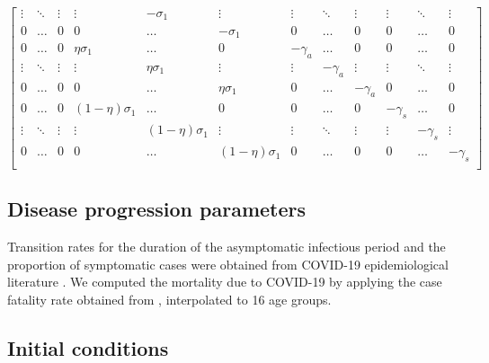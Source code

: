 {\begin{equation}
\begin{bmatrix}
\vdots & \ddots & \vdots &\vdots & -\sigma_1  & \vdots & \vdots & \ddots  & \vdots & \vdots & \ddots & \vdots\\
0 & \dots & 0  & 0 & \dots &-\sigma_1   & 0 & \dots & 0 & 0 & \dots & 0 \\ 
0 & \dots & 0  & \eta\sigma_1  & \dots & 0  & -\gamma_a & \dots & 0  & 0 & \dots & 0  \\
\vdots & \ddots & \vdots & \vdots & \eta\sigma_1  & \vdots & \vdots &  -\gamma_a & \vdots & \vdots & \ddots & \vdots\\
0 & \dots & 0  & 0 & \dots &  \eta\sigma_1 & 0 & \dots &  -\gamma_a  & 0 & \dots & 0  \\ 
0 & \dots & 0  &   (1 - \eta)\sigma_1 & \dots & 0  &  0 & \dots & 0  &  -\gamma_s & \dots & 0  \\
\vdots & \ddots & \vdots & \vdots &  (1 - \eta)\sigma_1 & \vdots & \vdots & \ddots & \vdots & \vdots &  -\gamma_s & \vdots\\
0 & \dots & 0  &  0 & \dots & (1 - \eta)\sigma_1 & 0 & \dots & 0  & 0 & \dots &  -\gamma_s  \\ 
\end{bmatrix}
\label{Sigmaeqn}
\end{equation}}
\normalsize
\subsection{Disease progression parameters}

Transition rates for the duration of the asymptomatic infectious period and the proportion of symptomatic cases were obtained from COVID-19 epidemiological literature \cite{nishiura2020serial,lauer2020incubation,tindale2020transmission}.  We computed the mortality due to COVID-19 by applying the case fatality rate obtained from \cite{publichealthontario}, interpolated to 16 age groups.

\subsection{Initial conditions}

